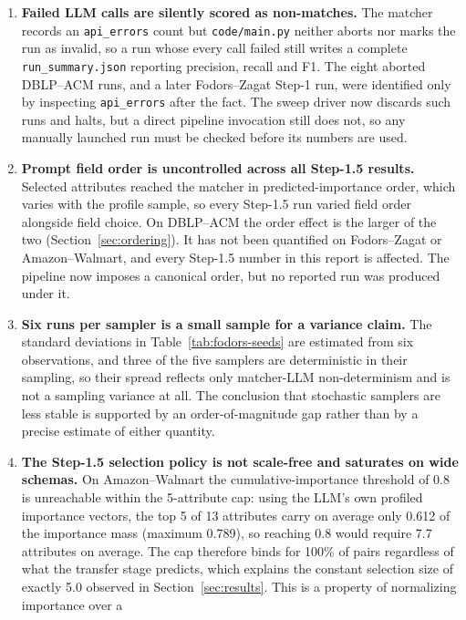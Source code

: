 \documentclass[11pt]{article}
\begin{document}
\begin{enumerate}
remains provisional, and is now known to be smaller than the reseeding spread of the
one sampler that was measured. Amazon--Walmart has no repeated-seed runs at all.
\item \textbf{Failed LLM calls are silently scored as non-matches.} The matcher
records an \texttt{api\_errors} count but \texttt{code/main.py} neither aborts nor
marks the run as invalid, so a run whose every call failed still writes a complete
\texttt{run\_summary.json} reporting precision, recall and F1. The eight aborted
DBLP--ACM runs, and a later Fodors--Zagat Step-1 run, were identified only by
inspecting \texttt{api\_errors} after the fact. The sweep driver now discards such
runs and halts, but a direct pipeline invocation still does not, so any manually
launched run must be checked before its numbers are used.
\item \textbf{Prompt field order is uncontrolled across all Step-1.5 results.}
Selected attributes reached the matcher in predicted-importance order, which varies
with the profile sample, so every Step-1.5 run varied field order alongside field
choice. On DBLP--ACM the order effect is the larger of the two
(Section~\ref{sec:ordering}). It has not been quantified on Fodors--Zagat or
Amazon--Walmart, and every Step-1.5 number in this report is affected. The pipeline
now imposes a canonical order, but no reported run was produced under it.
\item \textbf{Six runs per sampler is a small sample for a variance claim.} The
standard deviations in Table~\ref{tab:fodors-seeds} are estimated from six
observations, and three of the five samplers are deterministic in their sampling,
so their spread reflects only matcher-LLM non-determinism and is not a sampling
variance at all. The conclusion that stochastic samplers are less stable is
supported by an order-of-magnitude gap rather than by a precise estimate of either
quantity.
\item \textbf{The Step-1.5 selection policy is not scale-free and saturates on wide
schemas.} On Amazon--Walmart the cumulative-importance threshold of 0.8 is
unreachable within the 5-attribute cap: using the LLM's own profiled importance
vectors, the top 5 of 13 attributes carry on average only 0.612 of the importance
mass (maximum 0.789), so reaching 0.8 would require 7.7 attributes on average. The
cap therefore binds for 100\% of pairs regardless of what the transfer stage
predicts, which explains the constant selection size of exactly 5.0 observed in
Section~\ref{sec:results}. This is a property of normalizing importance over a

\end{enumerate}
\end{document}
